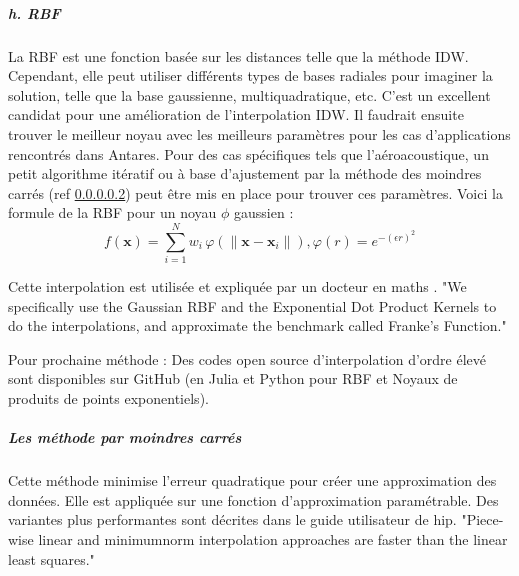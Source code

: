 \subparagraph{h. RBF}
La \ac{RBF} est une fonction basée sur les distances telle que la méthode IDW. Cependant, elle peut utiliser différents types de bases radiales pour imaginer la solution, telle que la base gaussienne, multiquadratique, etc. C'est un excellent candidat pour une amélioration de l'interpolation IDW. Il faudrait ensuite trouver le meilleur noyau avec les meilleurs paramètres pour les cas d'applications rencontrés dans Antares. Pour des cas spécifiques tels que l'aéroacoustique, un petit algorithme itératif ou à base d'ajustement par la méthode des moindres carrés (ref \ref{mc}) peut être mis en place pour trouver ces paramètres.
Voici la formule de la RBF pour un noyau \(\phi\) gaussien :
\begin{equation}
f(\mathbf{x}) = \sum_{i=1}^{N} w_{i} \, \varphi \left( \|\mathbf{x} - \mathbf{x}_{i}\| \right), \varphi(r) = e^{-(\epsilon r)^{2}}
\end{equation}



Cette interpolation est utilisée et expliquée par un docteur en maths \cite{Rosenfeld}.%
"We specifically use the Gaussian RBF and the Exponential Dot Product Kernels to do the interpolations, and approximate the benchmark called Franke's Function." \cite{opensource_2}

Pour prochaine méthode : Des codes open source d'interpolation d'ordre élevé sont disponibles sur GitHub (en Julia \cite{opensource} et Python \cite{opensource_2} pour RBF et Noyaux de produits de points exponentiels).

\subparagraph{Les méthode par moindres carrés}\label{mc}

Cette méthode minimise l'erreur quadratique pour créer une approximation des données. Elle est appliquée sur une fonction d'approximation paramétrable. Des variantes plus performantes sont décrites dans le guide utilisateur de hip.
"Piece-wise linear and minimumnorm interpolation approaches are faster than the linear least squares." \cite{muller2020}

